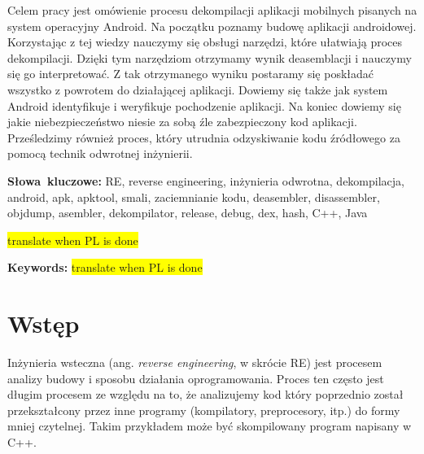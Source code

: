 \documentclass[12pt,a4paper,leqno,oneside,titlepage]{book}
\newenvironment{abstractpage}
  {\cleardoublepage\vspace*{\fill}\thispagestyle{empty}}
  {\vfill\cleardoublepage}
\newenvironment{abstract}[1]
  {\bigskip\selectlanguage{#1}%
   \begin{center}\bfseries\abstractname\end{center}}
  {\par\bigskip}
\newcommand{\todo}[1]{\colorbox{yellow}{#1}}
\begin{document}
\begin{abstractpage}
\begin{abstract}{polish}
Celem pracy jest omówienie procesu dekompilacji aplikacji mobilnych pisanych na system operacyjny Android.
Na początku poznamy budowę aplikacji androidowej. Korzystając z tej wiedzy nauczymy się obsługi narzędzi, które ułatwiają proces dekompilacji. Dzięki tym narzędziom otrzymamy wynik deasemblacji i nauczymy się go interpretować. Z tak otrzymanego wyniku postaramy się poskładać wszystko z powrotem do działającej aplikacji. Dowiemy się także jak system Android identyfikuje i weryfikuje pochodzenie aplikacji. Na koniec dowiemy się jakie niebezpieczeństwo niesie za sobą źle zabezpieczony kod aplikacji. Prześledzimy również proces, który utrudnia odzyskiwanie kodu źródłowego za pomocą technik odwrotnej inżynierii.
 
\end{abstract}
\smallskip
\noindent \textbf{Słowa~kluczowe:} RE, reverse engineering, inżynieria odwrotna, dekompilacja, android, apk, apktool, smali, zaciemnianie kodu,  deasembler, disassembler, objdump, asembler, dekompilator, release, debug, dex, hash, C++, Java

\begin{abstract}{english}
\todo{translate when PL is done}
\end{abstract}
\smallskip
\noindent \textbf{Keywords:} \todo{translate when PL is done}
\end{abstractpage}

\mainmatter


\chapter*{Wstęp}

Inżynieria wsteczna (ang. \emph{reverse engineering}, w skrócie RE) jest procesem analizy budowy i sposobu działania oprogramowania. Proces ten często jest długim procesem ze względu na to, że analizujemy kod który poprzednio został przekształcony przez inne programy (kompilatory, preprocesory, itp.) do formy mniej czytelnej. Takim przykładem może być skompilowany program napisany w C++.
\end{document}
